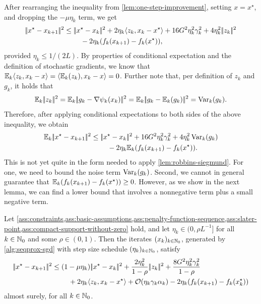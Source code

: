 After rearranging the inequality from \cref{lem:one-step-improvement}, setting $x = x^\star$, and
dropping the $-\mu\eta_k$ term, we get
\begin{align*}
    |\!|x^\star - x_{k+1}|\!|^2
    &\leq |\!|x^\star - x_k|\!|^2 + 2\eta_k\langle z_k, x_k - x^\star \rangle \notag + 16 G^2\eta_k^2\gamma_k^2 + 4\eta_k^2|\!|z_k|\!|^2 \\
    &\phantom{===} - 2\eta_k(f_k(x_{k+1}) - f_k(x^\star)),
\end{align*}
provided $\eta_k \leq 1/(2L)$.
By properties of conditional expectation and the definition of
stochastic gradients, we know that $\mathbb{E}_k \langle z_k, x_k - x \rangle = \langle \mathbb{E}_k(z_k), x_k - x \rangle = 0$.
Further note that, per definition of $z_k$ and $g_k$, it holds that
\[
    \mathbb{E}_k|\!|z_k|\!|^2 = \mathbb{E}_k|\!|g_k - \nabla \psi_k(x_k)|\!|^2 = \mathbb{E}_k|\!|g_k - \mathbb{E}_k(g_k)|\!|^2 = \operatorname{Var}_k(g_k).
\]
Therefore, after applying conditional expectations to both sides of the above
inequality, we obtain
\begin{align*}
    \mathbb{E}_k|\!|x^\star - x_{k+1}|\!|^2
    &\leq |\!|x^\star - x_k|\!|^2 + 16 G^2\eta_k^2\gamma_k^2 + 4\eta_k^2\operatorname{Var}_k(g_k) \notag \\
    &\phantom{===} - 2\eta_k\mathbb{E}_k(f_k(x_{k+1}) - f_k(x^\star)).
\end{align*}
This is not yet quite in the form needed to apply \cref{lem:robbins-siegmund}. For one,
we need to bound the noise term $\operatorname{Var}_k(g_k)$. Second, we cannot
in general guarantee that $\mathbb{E}_k(f_k(x_{k+1}) - f_k(x^\star)) \geq 0$.
However, as we show in the next lemma, we can find a lower bound that
involves a nonnegative term plus a small negative term.
\begin{lemma}
    \label{lem:recursion-for-almost-sure-convergence}
    Let \cref{ass:constraints,ass:basic-assumptions,ass:penalty-function-sequence,ass:slater-point,ass:compact-support-without-zero} hold, and
    let $\eta_k\in(0,\rho L^{-1}]$ for all $k\in\mathbb{N}_0$ and some $\rho\in(0,1)$. Then the iterates
    $(x_k)_{k\in\mathbb{N}_0}$, generated
    by \cref{alg:seqprox-sgd} with step size schedule $(\eta_k)_{k\in\mathbb{N}_0}$, satisfy
    \begin{align*}
        |\!|x^\star - x_{k+1}|\!|^2
        &\leq ( 1 - \mu\eta_k ) |\!|x^\star - x_k|\!|^2 + \frac{2\eta_k^2}{1 - \rho}|\!|z_k|\!|^2 + \frac{8 G^2\eta_k^2\gamma_k^2}{1 - \rho} \\
        &\phantom{===} + 2\eta_k\langle z_k, x_k - x^\star \rangle + \mathcal{O}(\eta_k\gamma_k\alpha_k) - 2\eta_k ( f_k(x_{k+1}) - f_k(x_k^\star) )
    \end{align*}
    almost surely, for all $k\in\mathbb{N}_0$.
\end{lemma}

